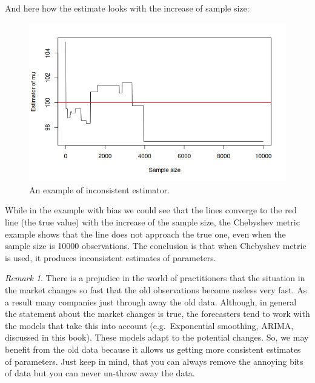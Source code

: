 \documentclass[
]{book}
\newenvironment{Shaded}{\begin{snugshade}}{\end{snugshade}}
\newcommand{\CharTok}[1]{\textcolor[rgb]{0.31,0.60,0.02}{#1}}
\newcommand{\DataTypeTok}[1]{\textcolor[rgb]{0.13,0.29,0.53}{#1}}
\newcommand{\DecValTok}[1]{\textcolor[rgb]{0.00,0.00,0.81}{#1}}
\newcommand{\KeywordTok}[1]{\textcolor[rgb]{0.13,0.29,0.53}{\textbf{#1}}}
\newcommand{\NormalTok}[1]{#1}
\newcommand{\OperatorTok}[1]{\textcolor[rgb]{0.81,0.36,0.00}{\textbf{#1}}}
\newcommand{\StringTok}[1]{\textcolor[rgb]{0.31,0.60,0.02}{#1}}
\theoremstyle{definition}
\theoremstyle{definition}
\theoremstyle{definition}
\theoremstyle{definition}
\theoremstyle{remark}
\newtheorem*{remark}{Remark}
\begin{document}
And here how the estimate looks with the increase of sample size:

\begin{Shaded}
\end{Shaded}

\begin{figure}
\centering
\includegraphics{images/02-statistics-consistency.png}
\caption{\label{fig:statsConsistency}An example of inconsistent estimator.}
\end{figure}

While in the example with bias we could see that the lines converge to the red line (the true value) with the increase of the sample size, the Chebyshev metric example shows that the line does not approach the true one, even when the sample size is 10000 observations. The conclusion is that when Chebyshev metric is used, it produces inconsistent estimates of parameters.

\begin{remark}
There is a prejudice in the world of practitioners that the situation in the market changes so fast that the old observations become useless very fast. As a result many companies just through away the old data. Although, in general the statement about the market changes is true, the forecasters tend to work with the models that take this into account (e.g.~Exponential smoothing, ARIMA, discussed in this book). These models adapt to the potential changes. So, we may benefit from the old data because it allows us getting more consistent estimates of parameters. Just keep in mind, that you can always remove the annoying bits of data but you can never un-throw away the data.
\end{remark}
\end{document}
